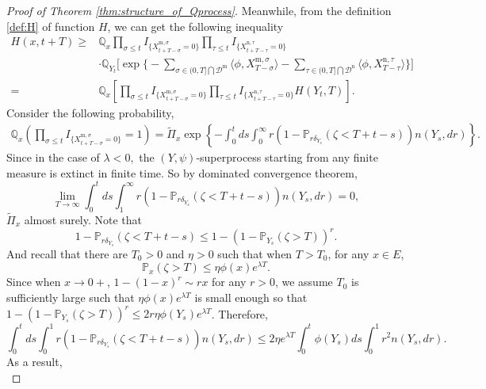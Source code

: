 \documentclass[12pt,a4paper]{amsart}
\numberwithin{equation}{section}
\theoremstyle{plain}
\theoremstyle{definition}
\begin{document}
{\begin{proof}[Proof of Theorem \ref{thm:structure_of_Qprocess}]
  Meanwhile, from the definition
  \eqref{def:H} of function $H$, we can get the following inequality
  \begin{equation}\label{eq:subsub}
    \begin{aligned}
      H(x,t+T)\geq& \mathbb Q_{x}\prod_{\sigma\leq t}I_{\{ X_{t+T-\sigma}^{{\mathrm m},\sigma}=0\}}\prod_{\tau\leq t}I_{\{ X_{t+T-\tau}^{{\mathrm n},\tau}=0\}}\\
      &\cdot\mathbb Q_{Y_t}\Big[\exp\Big\{-\sum_{\sigma\in (0, T]\bigcap \mathcal D^{\mathrm m}}\langle \phi, X_{T-\sigma}^{{\mathrm m},\sigma}\rangle -\sum_{\tau\in (0, T]\bigcap \mathcal D^{\mathrm n}}\langle \phi, X_{T-\tau}^{{\mathrm n},\tau}\rangle \Big\}\Big]\\
      =& \mathbb Q_{x}\left[\prod_{\sigma\leq t}I_{\{ X_{t+T-\sigma}^{{\mathrm m},\sigma}=0\}}\prod_{\tau\leq t}I_{\{ X_{t+T-\tau}^{{\mathrm n},\tau}=0\}}H(Y_t, T)\right].
    \end{aligned}
  \end{equation}
  Consider the following probability,
  \begin{eqnarray*}
    \mathbb Q_{x}\left(\prod_{\sigma\leq t}I_{\{ X_{t+T-\sigma}^{{\mathrm m},\sigma}=0\}}=1\right)
    =\widetilde\Pi_x\exp\left\{-\int_0^tds\int_0^\infty r(1-\mathbb P_{r\delta_{Y_s}}(\zeta<T+t-s))n(Y_s,dr)\right\}.
  \end{eqnarray*}
  Since in the case of $\lambda<0,$ the $(Y,\psi)$-superprocess starting from any finite measure is extinct in
  finite time.  So by dominated convergence theorem,
  \begin{equation}\label{eq:1_infty_limit}
    \lim_{T\rightarrow\infty}\int_0^tds\int_1^\infty r(1-\mathbb P_{r\delta_{Y_s}}(\zeta<T+t-s))n(Y_s,dr)=0,
  \end{equation}
  $\widetilde\Pi_x$ almost surely.   Note that
  \[
    1-\mathbb P_{r\delta_{Y_s}}(\zeta<T+t-s)\leq 1-(1-\mathbb P_{Y_s}(\zeta>T))^r.
  \]
  And recall that there are $T_0>0$ and $\eta>0$ such that when $T>T_0$, for any $x\in E$,
  \[
    \mathbb P_x(\zeta>T)\leq \eta \phi(x)e^{\lambda T}.
  \]
  Since when $x\rightarrow 0+$, $1-(1-x)^r\sim rx$ for any $r>0$, we assume $T_0$ is sufficiently large such that
  $\eta \phi(x)e^{\lambda T}$ is small enough so that $1-(1-\mathbb P_{Y_s}(\zeta>T))^r\leq 2r\eta \phi(Y_s)e^{\lambda T}$.
  Therefore,
  \[
    \int_0^tds\int_0^1 r(1-\mathbb P_{r\delta_{ Y_s}}(\zeta<T+t-s))n(Y_s,dr)\leq 2\eta e^{\lambda T}\int_0^t\phi(Y_s)ds\int_0^1 r^2 n(Y_s,dr).
  \]
  As a result,
  \begin{equation}\label{eq:01_limit}

\end{equation}
\end{proof}}
\end{document}
